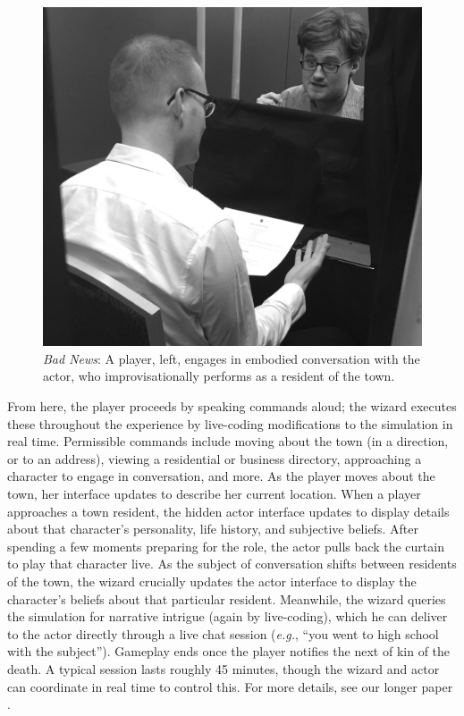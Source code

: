 \documentclass[letterpaper]{article}
\begin{document}
\begin{figure}[t]
  \centering
  \includegraphics[width=0.8\columnwidth]{images/bad_news-player_and_actor}
  \caption{\textit{Bad News}: A player, left, engages in embodied conversation with the actor, who improvisationally performs as a resident of the town.}
  \label{fig:bn-player_and_actor}
\end{figure}

From here, the player proceeds by speaking commands aloud; the wizard executes these throughout the experience by live-coding modifications to the simulation in real time. Permissible commands include moving about the town (in a direction, or to an address), viewing a residential or business directory, approaching a character to engage in conversation, and more. As the player moves about the town, her interface updates to describe her current location. When a player approaches a town resident, the hidden actor interface updates to display details about that character's personality, life history, and subjective beliefs. After spending a few moments preparing for the role, the actor pulls back the curtain to play that character live. As the subject of conversation shifts between residents of the town, the wizard crucially updates the actor interface to display the character's beliefs about that particular resident. Meanwhile, the wizard queries the simulation for narrative intrigue (again by live-coding), which he can deliver to the actor directly through a live chat session (\textit{e.g.}, ``you went to high school with the subject''). Gameplay ends once the player notifies the next of kin of the death. A typical session lasts roughly 45 minutes, though the wizard and actor can coordinate in real time to control this. For more details, see our longer paper \cite{samuel2016bad}.
\end{document}
